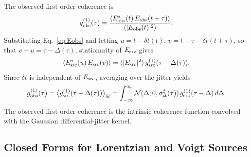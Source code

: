 \documentclass[aps,prd,onecolumn,amsmath,amssymb]{revtex4-2}
\begin{document}
The observed first-order coherence is
\begin{equation}
  g^{(1)}_{\rm obs}(\tau) = \frac{\langle E^*_{\rm obs}(t)\,E_{\rm obs}(t+\tau)\rangle}
                                  {\langle|E_{\rm obs}(t)|^2\rangle}.
  \label{eq:g1def}
\end{equation}
Substituting Eq.~\eqref{eq:Eobs} and letting
$u = t - \delta t(t)$, $v = t+\tau - \delta t(t+\tau)$, so that
$v - u = \tau - \Delta(\tau)$, stationarity of $E_{\rm src}$ gives
\begin{equation}
  \langle E^*_{\rm src}(u)\,E_{\rm src}(v)\rangle
  = \langle|E_{\rm src}|^2\rangle\,g^{(1)}_{\rm src}(\tau - \Delta(\tau)).
\end{equation}
Since $\delta t$ is independent of $E_{\rm src}$, averaging over the jitter
yields
\begin{equation}
  g^{(1)}_{\rm obs}(\tau)
    = \big\langle g^{(1)}_{\rm src}(\tau - \Delta(\tau))\big\rangle_{\delta t}
    = \int_{-\infty}^{\infty} \mathcal{N}(\Delta;0,\sigma_\Delta^2(\tau))\,
      g^{(1)}_{\rm src}(\tau - \Delta)\,d\Delta.
  \label{eq:g1obs}
\end{equation}
The observed first-order coherence is the intrinsic coherence function
convolved with the Gaussian differential-jitter kernel.

\subsection{Closed Forms for Lorentzian and Voigt Sources}
\end{document}
